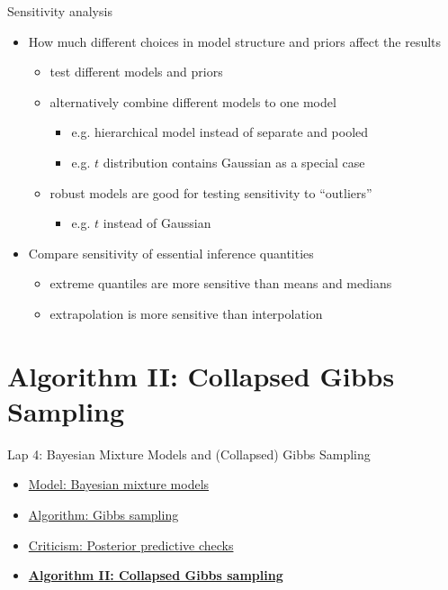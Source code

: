 \documentclass[aspectratio=169]{beamer}
\begin{document}
\begin{frame}{Sensitivity analysis}

  \begin{itemize}
  \item How much different choices in model structure and priors affect the results
    \begin{itemize}
      \item<2-> test different models and priors
      \item<3-> alternatively combine different models to one model
        \begin{itemize}
        \item e.g. hierarchical model instead of separate and pooled
        \item e.g. $t$ distribution contains Gaussian as a special case
      \end{itemize}
      \item<3-> robust models are good for testing sensitivity to ``outliers''
        \begin{itemize}
        \item e.g. $t$ instead of Gaussian
        \end{itemize}
    \end{itemize}
    \item<4-> Compare sensitivity of essential inference quantities
      \begin{itemize}
      \item extreme quantiles are more sensitive than means and medians
      \item extrapolation is more sensitive than interpolation
      \end{itemize}
    \end{itemize}

\end{frame}


\section{Algorithm II: Collapsed Gibbs Sampling}
\label{sec:collapsed_gibbs}

\begin{frame}{Lap 4: Bayesian Mixture Models and (Collapsed) Gibbs Sampling}
\begin{itemize}
    \item \hyperref[sec:mixtures]{Model: Bayesian mixture models}
    \item \hyperref[sec:gibbs]{Algorithm: Gibbs sampling}
    \item \hyperref[sec:ppcs]{Criticism: Posterior predictive checks}
    \item \hyperref[sec:collapsed_gibbs]{\textbf{Algorithm II: Collapsed Gibbs sampling}}
\end{itemize}
\end{frame}
\end{document}
